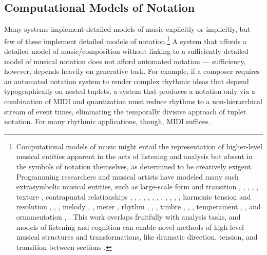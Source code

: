 \documentclass{article}
\begin{document}
\subsection{Computational Models of Notation}

Many systems implement detailed models of music explicitly or implicitly, but
few of these implement detailed models of notation.\footnote{Computational
models of music might entail the representation of higher-level musical
entities apparent in the acts of listening and analysis but absent in the
symbols of notation themselves, as determined to be creatively exigent.
Programming researchers and musical artists have modeled many such
extrasymbolic musical entities, such as large-scale form and transition
\cite{polansky1991morphological}, \cite{uno1994temporal},
\cite{dobrian1995algorithmic}, \cite{abrams1999higher}, \cite{Yoo1983}, texture
\cite{Horenstein:2004kx}, contrapuntal relationships \cite{Boenn:2009oq},
\cite{Acevedo2005}, \cite{Anders:2011kl}, \cite{Balser:1990tg},
\cite{Jones:2000hc}, \cite{uno1994temporal}, \cite{Bell:1995ij},
\cite{farbood2001analysis}, \cite{Cope:2002fv}, \cite{Laurson:2005dz},
\cite{Polansky:2011fu}, \cite{Ebcioglu:1980kl}, harmonic tension and resolution
\cite{Melo2003}, \cite{Wiggins1999}, \cite{Foster:1995qa}, melody
\cite{Hornel:1993mi}, \cite{Smith:1992pi}, meter \cite{Hamanaka:2005ff}, rhythm
\cite{Nauert2007}, \cite{Degazio:1996lh}, \cite{Collins:2003bs}, timbre
\cite{Xenakis:1991fu}, \cite{Creasey:1996ye}, \cite{Osaka2004}, temperament
\cite{Seymour:2007qo}, \cite{Graf:2006il}, and ornamentation
\cite{Ariza:2003zt}, \cite{Chico-Topfer:1998jl}. This work overlaps fruitfully
with analysis tasks, and models of listening and cognition can enable novel
methods of high-level musical structures and transformations, like dramatic
direction, tension, and transition between sections \cite[108]{Collins2009}.} A
system that affords a detailed model of music/composition without linking to a
sufficiently detailed model of musical notation does not afford automated
notation --- sufficiency, however, depends heavily on generative task. For
example, if a composer requires an automated notation system to render complex
rhythmic ideas that depend typographically on nested tuplets, a system that
produces a notation only via a combination of MIDI and quantization must reduce
rhythms to a non-hierarchical stream of event times, eliminating the temporally
divisive approach of tuplet notation. For many rhythmic applications, though,
MIDI suffices. 
\end{document}
